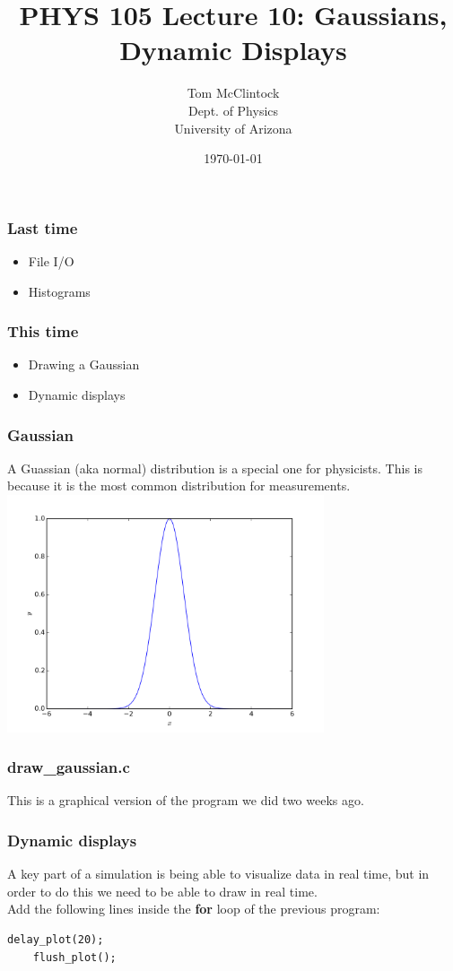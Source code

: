 \documentclass{beamer}
\title{PHYS 105 Lecture 10: Gaussians, Dynamic Displays}
\author{Tom McClintock \\
	Dept. of Physics\\
	University of Arizona
}
\date{\today}
\begin{document}
\begin{frame}
  \titlepage
\end{frame}

\begin{frame}
  \frametitle{Last time}
  \begin{itemize}
    \item File I/O
    \item Histograms
  \end{itemize}
\end{frame}

\begin{frame}
  \frametitle{This time}
  \begin{itemize}
    \item Drawing a Gaussian
    \item Dynamic displays
  \end{itemize}
\end{frame}

\begin{frame}
  \frametitle{Gaussian}
  A Guassian (aka normal) distribution is a special one for physicists.
  This is because it is the most common distribution for measurements.\\
  \centering
  \includegraphics[width=0.7\textwidth]{gaussian.png}
\end{frame}

\begin{frame}
  \frametitle{draw\_gaussian.c}
  This is a graphical version of the program we did two weeks ago.
  
\end{frame}

\begin{frame}[fragile]
  \frametitle{Dynamic displays}
  A key part of a simulation is being able to visualize data in real time, but
  in order to do this we need to be able to draw in real time.\\
  Add the following lines inside the \textbf{for} loop of the previous program:
  \begin{lstlisting}[style=customc]
    delay_plot(20);
    flush_plot();
  \end{lstlisting}
\end{frame}
\end{document}
